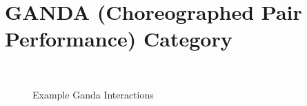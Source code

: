 \section{GANDA (Choreographed Pair Performance) Category}
\label{sec:ganda_category}

            \begin{figure}[ht!]
            \centering
            ~
            \caption{Example Ganda Interactions}
            \label{fig:example_ganda}
            \end{figure}



